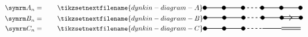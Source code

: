 \documentclass[fleqn, a4paper, openany]{memoir}
\begin{document}
    \begin{align}
        \A[n] &= \qquad
        \tikzsetnextfilename{dynkin-diagram-A}
        \begin{tikzpicture}[dynkin node/.style = {fill}, dynkin wire/.style = {thick}]
            \draw [dynkin node] (0, 0) circle [radius=0.1cm];
            \draw [dynkin wire] (0, 0) -- ++ (2, 0);
            \draw [dynkin node] (1, 0) circle [radius=0.1cm];
            \draw [dynkin node] (2, 0) circle [radius=0.1cm];
            \draw [dynkin wire, dashed] (2, 0) -- ++ (1, 0);
            \draw [dynkin wire] (3, 0) -- (5, 0);
            \draw [dynkin node] (3, 0) circle [radius=0.1cm];
            \draw [dynkin node] (4, 0) circle [radius=0.1cm];
            \draw [dynkin node] (5, 0) circle [radius=0.1cm];
        \end{tikzpicture}
        \\
        \B[n] &= \qquad
        \tikzsetnextfilename{dynkin-diagram-B}
        \begin{tikzpicture}[dynkin node/.style = {fill}, dynkin wire/.style = {thick}]
            \draw [dynkin node] (0, 0) circle [radius=0.1cm];
            \draw [dynkin wire] (0, 0) -- ++ (2, 0);
            \draw [dynkin node] (1, 0) circle [radius=0.1cm];
            \draw [dynkin node] (2, 0) circle [radius=0.1cm];
            \draw [dynkin wire, dashed] (2, 0) -- ++ (1, 0);
            \draw [dynkin wire] (3, 0) -- (4, 0);
            \draw [dynkin wire] (4, -0.05) -- ++ (1, 0);
            \draw [dynkin wire] (4, 0.05) -- ++ (1, 0);
            \draw [dynkin node] (3, 0) circle [radius=0.1cm];
            \draw [dynkin node] (4, 0) circle [radius=0.1cm];
            \draw [dynkin node] (5, 0) circle [radius=0.1cm];
            \draw [-{>[width=0.3cm, length=0.15cm]}, dynkin wire] (4.55, 0) -- ++ (0.001, 0);
        \end{tikzpicture}
        \\
        \C[n] &= \qquad
        \tikzsetnextfilename{dynkin-diagram-C}
        \begin{tikzpicture}[dynkin node/.style = {fill}, dynkin wire/.style = {thick}]
            \draw [dynkin node] (0, 0) circle [radius=0.1cm];
            \draw [dynkin wire] (0, 0) -- ++ (2, 0);
            \draw [dynkin node] (1, 0) circle [radius=0.1cm];
            \draw [dynkin node] (2, 0) circle [radius=0.1cm];
            \draw [dynkin wire, dashed] (2, 0) -- ++ (1, 0);
            \draw [dynkin wire] (3, 0) -- (4, 0);
            \draw [dynkin wire] (4, -0.05) -- ++ (1, 0);
            \draw [dynkin wire] (4, 0.05) -- ++ (1, 0);

\end{tikzpicture}
\end{align}
\end{document}
